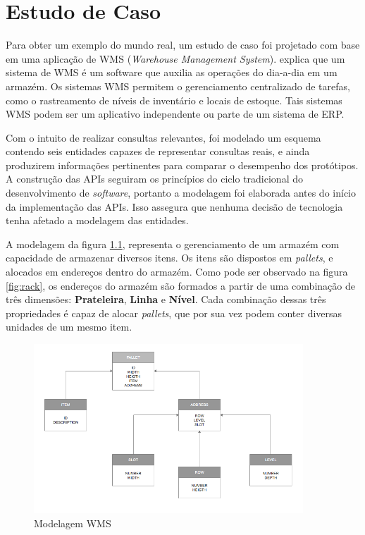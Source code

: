 \chapter[Estudo de Caso]{Estudo de Caso}\label{cap:estudo}

Para obter um exemplo do mundo real, um estudo de caso foi projetado com base em uma aplicação de WMS (\textit{Warehouse Management System}).  explica que um sistema de WMS é um software que auxilia as operações do dia-a-dia em um armazém. Os sistemas WMS permitem o gerenciamento centralizado de tarefas, como o rastreamento de níveis de inventário e locais de estoque. Tais sistemas WMS podem ser um aplicativo independente ou parte de um sistema de ERP.

Com o intuito de realizar consultas relevantes, foi modelado um esquema contendo seis entidades capazes de representar consultas reais, e ainda produzirem informações pertinentes para comparar o desempenho dos protótipos. A construção das APIs seguiram os princípios do ciclo tradicional do desenvolvimento de \textit{software}, portanto a modelagem foi elaborada antes do início da implementação das APIs. Isso assegura que nenhuma decisão de tecnologia tenha afetado a modelagem das entidades.

A modelagem da figura \ref{fig:modelagem}, representa o gerenciamento de um armazém com capacidade de armazenar diversos itens. Os itens são dispostos em \textit{pallets}, e alocados em endereços dentro do armazém. Como pode ser observado na figura \ref{fig:rack}, os endereços do armazém são formados a partir de uma combinação de três dimensões: \textbf{Prateleira}, \textbf{Linha} e \textbf{Nível}. Cada combinação dessas três propriedades é capaz de alocar \textit{pallets}, que por sua vez podem conter diversas unidades de um mesmo item.

\begin{figure}[htbp]
\centering
\includegraphics[width=0.9\textwidth]{figuras/model.png}
\caption{Modelagem WMS}
\label{fig:modelagem}
\end{figure}

